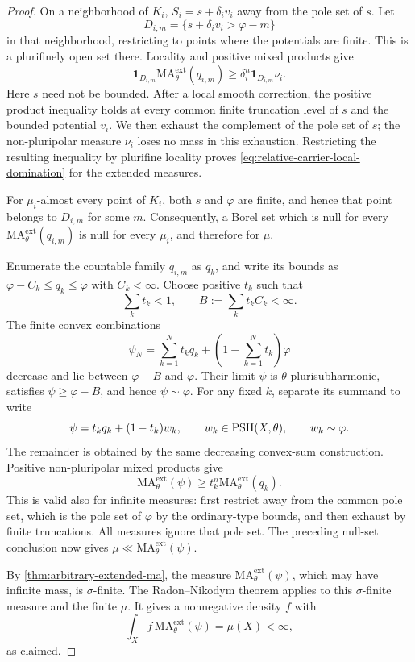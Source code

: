 \begin{proof}
On a neighborhood of $K_i$, $S_i=s+\delta_i v_i$ away from the pole set of $s$. Let
\[
 D_{i,m}=\{s+\delta_i v_i>\varphi-m\}
\]
in that neighborhood, restricting to points where the potentials are finite. This is a plurifinely open set there. Locality and positive mixed products give
\begin{equation}\label{eq:relative-carrier-local-domination}
 \mathbf1_{D_{i,m}}\mathrm{MA}^{\mathrm{ext}}_\theta(q_{i,m})
 \geq\delta_i^n\mathbf1_{D_{i,m}}\nu_i.
\end{equation}
Here $s$ need not be bounded. After a local smooth correction, the positive product inequality holds at every common finite truncation level of $s$ and the bounded potential $v_i$. We then exhaust the complement of the pole set of $s$; the non-pluripolar measure $\nu_i$ loses no mass in this exhaustion. Restricting the resulting inequality by plurifine locality proves \eqref{eq:relative-carrier-local-domination} for the extended measures.

For $\mu_i$-almost every point of $K_i$, both $s$ and $\varphi$ are finite, and hence that point belongs to $D_{i,m}$ for some $m$. Consequently, a Borel set which is null for every $\mathrm{MA}^{\mathrm{ext}}_\theta(q_{i,m})$ is null for every $\mu_i$, and therefore for $\mu$.

Enumerate the countable family $q_{i,m}$ as $q_k$, and write its bounds as
$\varphi-C_k\leq q_k\leq\varphi$ with $C_k<\infty$. Choose positive $t_k$ such that
\[
 \sum_k t_k<1,\qquad B:=\sum_k t_kC_k<\infty.
\]
The finite convex combinations
\[
 \psi_N=\sum_{k=1}^N t_kq_k
               +\left(1-\sum_{k=1}^N t_k\right)\varphi
\]
decrease and lie between $\varphi-B$ and $\varphi$. Their limit $\psi$ is $\theta$-plurisubharmonic, satisfies $\psi\geq\varphi-B$, and hence $\psi\sim\varphi$. For any fixed $k$, separate its summand to write
\[
 \psi=t_kq_k+(1-t_k)w_k,
 \qquad w_k\in\mathrm{PSH}(X,\theta),\qquad w_k\sim\varphi.
\]
The remainder is obtained by the same decreasing convex-sum construction. Positive non-pluripolar mixed products give
\[
 \mathrm{MA}^{\mathrm{ext}}_\theta(\psi)
       \geq t_k^n\mathrm{MA}^{\mathrm{ext}}_\theta(q_k).
\]
This is valid also for infinite measures: first restrict away from the common pole set, which is the pole set of $\varphi$ by the ordinary-type bounds, and then exhaust by finite truncations. All measures ignore that pole set. The preceding null-set conclusion now gives
$\mu\ll\mathrm{MA}^{\mathrm{ext}}_\theta(\psi)$.

By \cref{thm:arbitrary-extended-ma}, the measure $\mathrm{MA}^{\mathrm{ext}}_\theta(\psi)$, which may have infinite mass, is $\sigma$-finite. The Radon--Nikodym theorem applies to this $\sigma$-finite measure and the finite $\mu$. It gives a nonnegative density $f$ with
\[
 \int_X f\,\mathrm{MA}^{\mathrm{ext}}_\theta(\psi)=\mu(X)<\infty,
\]
as claimed.
\end{proof}
